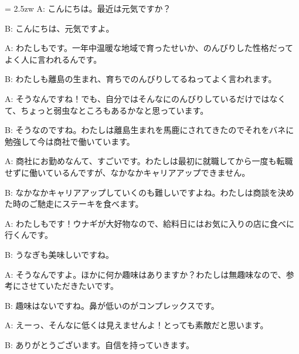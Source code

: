 \documentclass[11pt]{amsart}
\title{}
\author{}
\newenvironment{hangall}[1]{\hangindent = 2.5zw\everypar{\hangindent = 2.5zw}}{}
\begin{document}
\maketitle
\begin{hangall}{}%
A: こんにちは。最近は元気ですか？

B: こんにちは、元気ですよ。

A: わたしもです。一年中温暖な地域で育ったせいか、のんびりした性格だってよく人に言われるんです。

B: わたしも離島の生まれ、育ちでのんびりしてるねってよく言われます。

A: そうなんですね！でも、自分ではそんなにのんびりしているだけではなくて、ちょっと弱虫なところもあるかなと思っています。

B: そうなのですね。わたしは離島生まれを馬鹿にされてきたのでそれをバネに勉強して今は商社で働いています。

A: 商社にお勤めなんて、すごいです。わたしは最初に就職してから一度も転職せずに働いているんですが、なかなかキャリアアップできません。

B: なかなかキャリアアップしていくのも難しいですよね。わたしは商談を決めた時のご馳走にステーキを食べます。

A: わたしもです！ウナギが大好物なので、給料日にはお気に入りの店に食べに行くんです。

B: うなぎも美味しいですね。

A: そうなんですよ。ほかに何か趣味はありますか？わたしは無趣味なので、参考にさせていただきたいです。

B: 趣味はないですね。鼻が低いのがコンプレックスです。

A: えーっ、そんなに低くは見えませんよ！とっても素敵だと思います。

B: ありがとうございます。自信を持っていきます。
\end{hangall}
\end{document}
